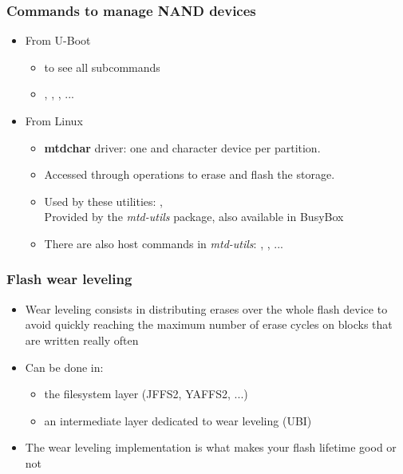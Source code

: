 \begin{frame}[fragile]
  \frametitle{Commands to manage NAND devices}
  \begin{itemize}
  \item From U-Boot
     \begin{itemize}
     \item {} to see all  subcommands
     \item {}, , , ...
     \end{itemize}
  \item From Linux
     \begin{itemize}
     \item {\bf mtdchar} driver: one  and 
           character device per partition.
     \item Accessed through  operations to erase and flash
	   the storage.
     \item Used by these utilities: , \\
           Provided by the {\em mtd-utils} package, also available in BusyBox
     \item There are also host commands in {\em mtd-utils}: , , ...
     \end{itemize}
  \end{itemize}
\end{frame}

\begin{frame}
  \frametitle{Flash wear leveling}
  \begin{itemize}
  \item Wear leveling consists in distributing erases over the whole
    flash device to avoid quickly reaching the maximum number of erase
    cycles on blocks that are written really often
  \item Can be done in:
    \begin{itemize}
    \item the filesystem layer (JFFS2, YAFFS2, ...)
    \item an intermediate layer dedicated to wear leveling (UBI)
    \end{itemize}
  \item The wear leveling implementation is what makes your flash
    lifetime good or not
  \end{itemize}
\end{frame}

